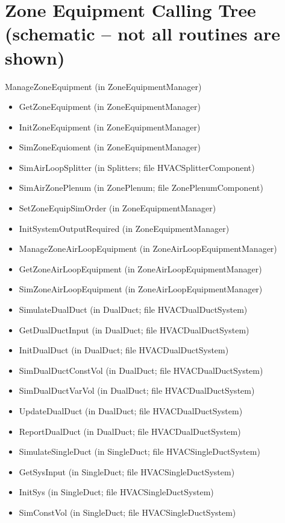 \section{Zone Equipment Calling Tree (schematic -- not all routines are shown)}\label{zone-equipment-calling-tree-schematic-not-all-routines-are-shown}

ManageZoneEquipment (in ZoneEquipmentManager)

\begin{itemize}
\item
  GetZoneEquipment (in ZoneEquipmentManager)
\item
  InitZoneEquipment (in ZoneEquipmentManager)
\item
  SimZoneEquioment (in ZoneEquipmentManager)
\item
  SimAirLoopSplitter (in Splitters; file HVACSplitterComponent)
\item
  SimAirZonePlenum (in ZonePlenum; file ZonePlenumComponent)
\item
  SetZoneEquipSimOrder (in ZoneEquipmentManager)
\item
  InitSystemOutputRequired (in ZoneEquipmentManager)
\item
  ManageZoneAirLoopEquipment (in ZoneAirLoopEquipmentManager)
\item
  GetZoneAirLoopEquipment (in ZoneAirLoopEquipmentManager)
\item
  SimZoneAirLoopEquipment (in ZoneAirLoopEquipmentManager)
\item
  SimulateDualDuct (in DualDuct; file HVACDualDuctSystem)
\item
  GetDualDuctInput (in DualDuct; file HVACDualDuctSystem)
\item
  InitDualDuct (in DualDuct; file HVACDualDuctSystem)
\item
  SimDualDuctConstVol (in DualDuct; file HVACDualDuctSystem)
\item
  SimDualDuctVarVol (in DualDuct; file HVACDualDuctSystem)
\item
  UpdateDualDuct (in DualDuct; file HVACDualDuctSystem)
\item
  ReportDualDuct (in DualDuct; file HVACDualDuctSystem)
\item
  SimulateSingleDuct (in SingleDuct; file HVACSingleDuctSystem)
\item
  GetSysInput (in SingleDuct; file HVACSingleDuctSystem)
\item
  InitSys (in SingleDuct; file HVACSingleDuctSystem)
\item
  SimConstVol (in SingleDuct; file HVACSingleDuctSystem)

\end{itemize}
